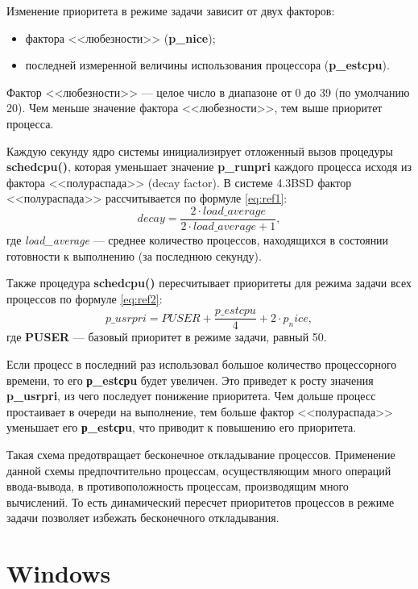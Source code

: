 Изменение приоритета в режиме задачи зависит от двух факторов: 
\begin{itemize}
	\item фактора <<любезности>> (\textbf{p\_nice});
	\item последней измеренной величины использования процессора (\textbf{p\_estcpu}).
\end{itemize}

Фактор <<любезности>> --- целое число в диапазоне от 0 до 39 (по умолчанию 20).
Чем меньше значение фактора <<любезности>>, тем выше приоритет процесса.

Каждую секунду ядро системы инициализирует отложенный вызов процедуры \textbf{schedcpu()}, которая уменьшает значение \textbf{p\_runpri} каждого процесса исходя из фактора <<полураспада>> (decay factor). В системе 4.3BSD фактор <<полураспада>> рассчитывается по формуле \ref{eq:ref1}:
\begin{equation}
	\label{eq:ref1}
	decay = \frac{2 \cdot load\_average}{2 \cdot load\_average + 1} ,
\end{equation}
где \textit{load\_average} --- среднее количество процессов, находящихся в состоянии готовности к выполнению (за последнюю секунду).

Также процедура \textbf{schedcpu()} пересчитывает приоритеты для режима задачи всех процессов по формуле \ref{eq:ref2}:
\begin{equation}\label{eq:ref2}
	p\_usrpri=PUSER+\frac{p\_estcpu}{4}+2\cdot p_nice,
\end{equation}
где \textbf{PUSER} --- базовый приоритет в режиме задачи, равный 50.

Если процесс в последний раз использовал большое количество процессорного времени, то его \textbf{р\_estсрu} будет увеличен.
Это приведет к росту значения \textbf{p\_usrpri}, из чего последует понижение приоритета.
Чем дольше процесс простаивает в очереди на выполнение, тем больше фактор <<полураспада>> уменьшает его \textbf{р\_estсрu}, что приводит к повышению его приоритета.

Такая схема предотвращает бесконечное откладывание процессов. 
Применение данной схемы предпочтительно процессам, осуществляющим много операций ввода-вывода, в противоположность процессам, производящим много вычислений.
То есть динамический пересчет приоритетов процессов в режиме задачи позволяет избежать бесконечного откладывания.

\section{Windows}

